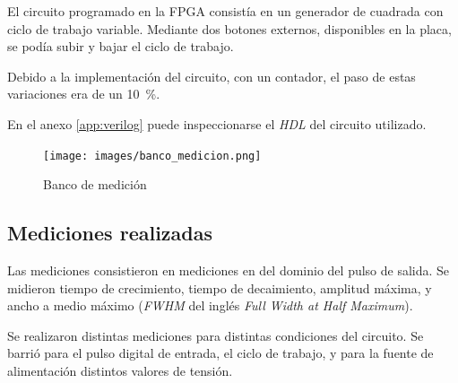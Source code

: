 El circuito programado en la FPGA consistía en un generador de cuadrada con
ciclo de trabajo variable. Mediante dos botones externos, disponibles en la
placa, se podía subir y bajar el ciclo de trabajo.

Debido a la implementación del circuito, con un contador, el paso de estas
variaciones era de un \qty{10}{\percent}.

En el anexo \ref{app:verilog} puede inspeccionarse el \textit{HDL} del circuito utilizado.

\begin{figure}
  \centering
    \texttt{[image: images/banco\_medicion.png]}
    \caption{Banco de medición}
    \label{fig:banco_medicion}
\end{figure}

\subsection{Mediciones realizadas}

Las mediciones consistieron en mediciones en del dominio del pulso de salida. Se
midieron tiempo de crecimiento, tiempo de decaimiento, amplitud máxima, y ancho
a medio máximo (\textit{FWHM} del inglés \textit{Full Width at Half Maximum}).

Se realizaron distintas mediciones para distintas condiciones del circuito. Se
barrió para el pulso digital de entrada, el ciclo de trabajo, y para la fuente
de alimentación distintos valores de tensión.

